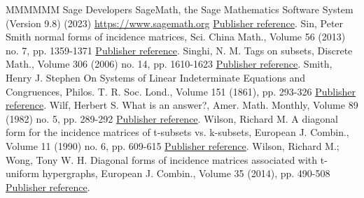 \documentclass[11pt]{article}
\theoremstyle{definition}
\numberwithin{equation}{section}
\numberwithin{equation}{section}
\begin{document}
\begin{thebibliography}{MMMMMM}
 Sage Developers SageMath, the Sage Mathematics Software System (Version 9.8) (2023) \url{https://www.sagemath.org} \href{https://alco.centre-mersenne.org/articles/10.5802/alco.406/#sagemath}{Publisher reference}.
 Sin, Peter Smith normal forms of incidence matrices, Sci. China Math., Volume 56 (2013) no. 7, pp. 1359-1371 \href{https://alco.centre-mersenne.org/articles/10.5802/alco.406/#snf-inc}{Publisher reference}.
 Singhi, N. M. Tags on subsets, Discrete Math., Volume 306 (2006) no. 14, pp. 1610-1623 \href{https://alco.centre-mersenne.org/articles/10.5802/alco.406/#singhi}{Publisher reference}.
 Smith, Henry J. Stephen On Systems of Linear Indeterminate Equations and Congruences, Philos. T. R. Soc. Lond., Volume 151 (1861), pp. 293-326 \href{https://alco.centre-mersenne.org/articles/10.5802/alco.406/#smith1861}{Publisher reference}.
 Wilf, Herbert S. What is an answer?, Amer. Math. Monthly, Volume 89 (1982) no. 5, pp. 289-292 \href{https://alco.centre-mersenne.org/articles/10.5802/alco.406/#wilf}{Publisher reference}.
 Wilson, Richard M. A diagonal form for the incidence matrices of t-subsets vs. k-subsets, European J. Combin., Volume 11 (1990) no. 6, pp. 609-615 \href{https://alco.centre-mersenne.org/articles/10.5802/alco.406/#wilson_classic}{Publisher reference}.
 Wilson, Richard M.; Wong, Tony W. H. Diagonal forms of incidence matrices associated with t-uniform hypergraphs, European J. Combin., Volume 35 (2014), pp. 490-508 \href{https://alco.centre-mersenne.org/articles/10.5802/alco.406/#wong}{Publisher reference}.
\end{thebibliography}
\end{document}
